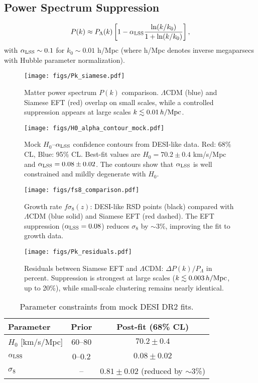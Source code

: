 \documentclass[11pt,a4paper]{article}
\begin{document}
\subsection{Power Spectrum Suppression}
\begin{equation}
P(k) \approx P_\Lambda(k) \left[ 1 - \alpha_{\rm LSS} \frac{\ln(k/k_0)}{1 + \ln(k/k_0)} \right],
\end{equation}
with $\alpha_{\rm LSS} \sim 0.1$ for $k_0 \sim 0.01$ h/Mpc (where h/Mpc denotes inverse megaparsecs with Hubble parameter normalization).
\begin{figure}[h]
\centering
\texttt{[image: figs/Pk\_siamese.pdf]}
\caption{Matter power spectrum $P(k)$ comparison. $\Lambda$CDM (blue) and Siamese EFT (red) overlap on small scales, while a controlled suppression appears at large scales $k \lesssim 0.01\,h/{\rm Mpc}$.}
\label{fig:pk}
\end{figure}
\begin{figure}[h]
\centering
\texttt{[image: figs/H0\_alpha\_contour\_mock.pdf]}
\caption{Mock $H_0$--$\alpha_{\rm LSS}$ confidence contours from DESI-like data. Red: 68\% CL, Blue: 95\% CL. Best-fit values are $H_0=70.2\pm0.4$ km/s/Mpc and $\alpha_{\rm LSS}=0.08\pm0.02$. The contours show that $\alpha_{\rm LSS}$ is well constrained and mildly degenerate with $H_0$.}
\label{fig:H0alpha}
\end{figure}
\begin{figure}[h]
\centering
\texttt{[image: figs/fs8\_comparison.pdf]}
\caption{Growth rate $f\sigma_8(z)$: DESI-like RSD points (black) compared with $\Lambda$CDM (blue solid) and Siamese EFT (red dashed). The EFT suppression ($\alpha_{\rm LSS}=0.08$) reduces $\sigma_8$ by $\sim$3\%, improving the fit to growth data.}
\label{fig:fs8}
\end{figure}
\begin{figure}[h]
\centering
\texttt{[image: figs/Pk\_residuals.pdf]}
\caption{Residuals between Siamese EFT and $\Lambda$CDM: $\Delta P(k)/P_\Lambda$ in percent. Suppression is strongest at large scales ($k \lesssim 0.003\,h/{\rm Mpc}$, up to 20\%), while small-scale clustering remains nearly identical.}
\label{fig:residuals}
\end{figure}
\begin{table}[h]
\centering
\begin{tabular}{lcc}
\toprule
Parameter & Prior & Post-fit (68\% CL) \\
\midrule
$H_0$ [km/s/Mpc] & $60$--$80$ & $70.2 \pm 0.4$ \\
$\alpha_{\rm LSS}$ & $0$--$0.2$ & $0.08 \pm 0.02$ \\
$\sigma_8$ & -- & $0.81 \pm 0.02$ (reduced by $\sim$3\%) \\
\bottomrule
\end{tabular}
\caption{Parameter constraints from mock DESI DR2 fits.}
\label{tab:params_stats}
\end{table}
\end{document}
